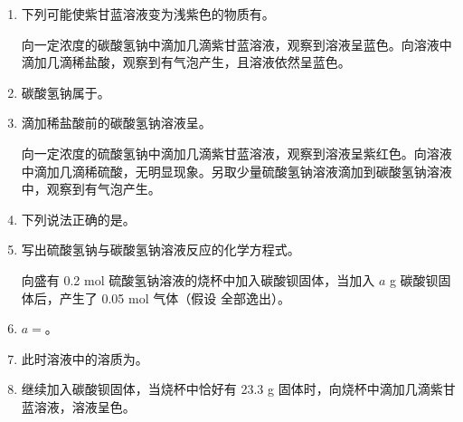 \documentclass[11pt,a4paper]{article}
\begin{document}
\begin{enumerate}[label=（\arabic*）]
\item 下列可能使紫甘蓝溶液变为浅紫色的物质有\blank[3em]。

向一定浓度的碳酸氢钠中滴加几滴紫甘蓝溶液，观察到溶液呈蓝色。向溶液中滴加几滴稀盐酸，观察到有气泡产生，且溶液依然呈蓝色。

\item 碳酸氢钠属于\blank[3em]。

\item 滴加稀盐酸前的碳酸氢钠溶液呈\blank[3em]。

向一定浓度的硫酸氢钠中滴加几滴紫甘蓝溶液，观察到溶液呈紫红色。向溶液中滴加几滴稀硫酸，无明显现象。另取少量硫酸氢钠溶液滴加到碳酸氢钠溶液中，观察到有气泡产生。

\item 下列说法正确的是\blank[3em]。

\item 写出硫酸氢钠与碳酸氢钠溶液反应的化学方程式\blank[10em]。

向盛有 0.2 mol 硫酸氢钠溶液的烧杯中加入碳酸钡固体，当加入 $a$ g 碳酸钡固体后，产生了 0.05 mol 气体（假设  全部逸出）。

\item $a =$\blank[4em]。

\item 此时溶液中的溶质为\blank[6em]。

\item 继续加入碳酸钡固体，当烧杯中恰好有 23.3 g 固体时，向烧杯中滴加几滴紫甘蓝溶液，溶液呈\blank[2em]色。
\end{enumerate}

\ifanswer
\newpage
{}
\end{document}
